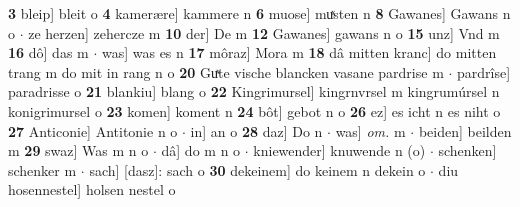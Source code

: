 \documentclass[8pt,a4paper,notitlepage]{article}
\begin{document}
\begin{table}[ht]
\begin{minipage}[t]{0.5\linewidth}
\textbf{3} bleip] bleit o \textbf{4} kamerære] kammere n \textbf{6} muose] muͯsten n \textbf{8} Gawanes] Gawans n o  $\cdot$ ze herzen] zehercze m \textbf{10} der] De m \textbf{12} Gawanes] gawans n o \textbf{15} unz] Vnd m \textbf{16} dô] das m  $\cdot$ was] was es n \textbf{17} môraz] Mora m \textbf{18} dâ mitten kranc] do mitten trang m do mit in rang n o \textbf{20} Guͯte vische blancken vasane pardrise m  $\cdot$ pardrîse] paradrisse o \textbf{21} blankiu] blang o \textbf{22} Kingrimursel] kingrnvrsel m kingrumúrsel n konigrimursel o \textbf{23} komen] koment n \textbf{24} bôt] gebot n o \textbf{26} ez] es icht n es niht o \textbf{27} Anticonie] Antitonie n o  $\cdot$ in] an o \textbf{28} daz] Do n  $\cdot$ was] \textit{om.} m  $\cdot$ beiden] beilden m \textbf{29} swaz] Was m n o  $\cdot$ dâ] do m n o  $\cdot$ kniewender] knuwende n (o)  $\cdot$ schenken] schenker m  $\cdot$ sach] [dasz]: sach o \textbf{30} dekeinem] do keinem n dekein o  $\cdot$ diu hosennestel] holsen nestel o \newline
\end{minipage}
\end{table}
\newpage
\end{document}
